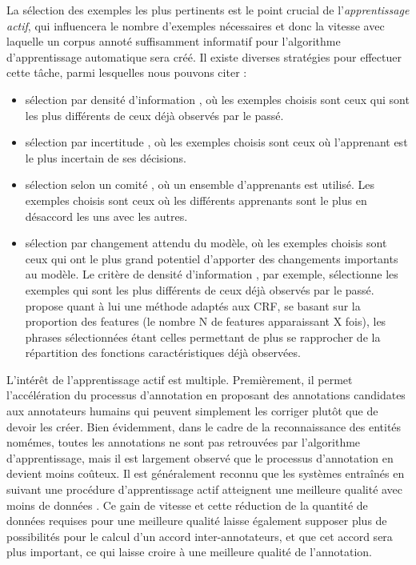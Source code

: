 \documentclass[PhD-Yoann-Dupont.tex]{subfiles}
\begin{document}
La sélection des exemples les plus pertinents est le point crucial de l'\textit{apprentissage actif}, qui influencera le nombre d'exemples nécessaires et donc la vitesse avec laquelle un corpus annoté suffisamment informatif pour l'algorithme d'apprentissage automatique sera créé. Il existe diverses stratégies pour effectuer cette tâche, parmi lesquelles nous pouvons citer :

\begin{itemize}
    \item sélection par densité d'information \citep{settles2008analysis}, où les exemples choisis sont ceux qui sont les plus différents de ceux déjà observés par le passé.
    \item sélection par incertitude \citep{lewis1994sequential}, où les exemples choisis sont ceux où l'apprenant est le plus incertain de ses décisions.
    \item sélection selon un comité \citep{mamitsuka1998query}, où un ensemble d'apprenants est utilisé. Les exemples choisis sont ceux où les différents apprenants sont le plus en désaccord les uns avec les autres.
    \item sélection par changement attendu du modèle, où les exemples choisis sont ceux qui ont le plus grand potentiel d'apporter des changements importants au modèle. Le critère de densité d'information \citep{settles2008analysis}, par exemple, sélectionne les exemples qui sont les plus différents de ceux déjà observés par le passé. \citet{claveau2017strategies} propose quant à lui une méthode adaptés aux CRF, se basant sur la proportion des features (le nombre N de features apparaissant X fois), les phrases sélectionnées étant celles permettant de plus se rapprocher de la répartition des fonctions caractéristiques déjà observées.
\end{itemize}

L'intérêt de l'apprentissage actif est multiple. Premièrement, il permet l'accélération du processus d'annotation en proposant des annotations candidates aux annotateurs humains qui peuvent simplement les corriger plutôt que de devoir les créer. Bien évidemment, dans le cadre de la reconnaissance des entités nomémes, toutes les annotations ne sont pas retrouvées par l'algorithme d'apprentissage, mais il est largement observé que le processus d'annotation en devient moins coûteux. Il est généralement reconnu que les systèmes entraînés en suivant une procédure d'apprentissage actif atteignent une meilleure qualité avec moins de données \citep{settles2011theories}. Ce gain de vitesse et cette réduction de la quantité de données requises pour une meilleure qualité laisse également supposer plus de possibilités pour le calcul d'un accord inter-annotateurs, et que cet accord sera plus important, ce qui laisse croire à une meilleure qualité de l'annotation.
\end{document}
